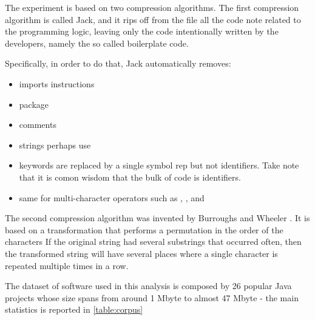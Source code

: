 
The experiment is based on two compression algorithms.
The first compression algorithm is called Jack, and it rips off from the file all the code note related to the programming logic, leaving
only the code intentionally written by the developers, namely the so called boilerplate code.

Specifically, in order to do that, Jack automatically removes:

\begin{itemize}
\item imports instructions
\item package
\item comments
\item strings perhaps use
\item keywords are replaced by a single symbol rep
but not identifiers. Take note that it is comon wisdom that the bulk of code is identifiers.
\item same for multi-character operators such as \cc{->}, \cc{[]}, and \cc{<<<<=}
\end{itemize}

The second compression algorithm was invented by Burroughs and Wheeler
\cite{Burrows:Wheeler:1994}. It is based on a transformation that performs a
permutation in the order of the characters If the original string had several
substrings that occurred often, then the transformed string will have several
places where a single character is repeated multiple times in a row.

The dataset of software used in this analysis is composed by 26 popular Java
projects whose size spans from around 1 Mbyte to almost 47 Mbyte - the main
statistics is reported in \cref{table:corpus}

\begin{table}
  \label{table:corpus}
  \caption{The results of the compression using the Burroughs-Wheeler algorithm}
  \centering
\end{table}
